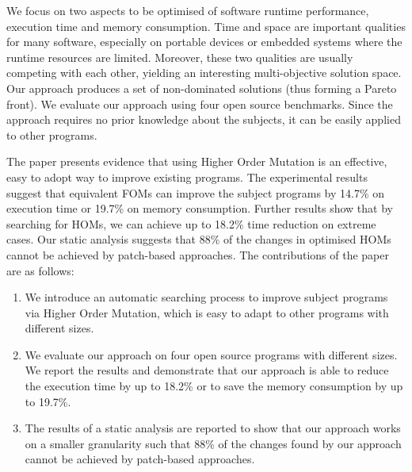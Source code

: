 \documentclass[oribibl]{llncs}
\begin{document}
We focus on two aspects to be optimised of software runtime performance, execution time and memory consumption.
Time and space are important qualities for many software, especially on portable devices or embedded systems where the runtime resources are limited.
Moreover, these two qualities are usually competing with each other, yielding an interesting multi-objective solution space.
Our approach produces a set of non-dominated solutions (thus forming a Pareto front).
We evaluate our approach using four open source benchmarks. 
Since the approach requires no prior knowledge about the subjects, it can be easily applied to other programs.

The paper presents evidence that using Higher Order Mutation is an effective, easy to adopt way to improve existing programs. 
The experimental results suggest that equivalent FOMs can improve the subject programs by 14.7\% on execution time or 19.7\% on memory consumption.
Further results show that by searching for HOMs, we can achieve up to 18.2\% time reduction on extreme cases.
Our static analysis suggests that 88\% of the changes in optimised HOMs cannot be achieved by patch-based approaches.
The contributions of the paper are as follows:
\begin{enumerate}
\item We introduce an automatic searching process to improve subject programs via Higher Order Mutation, which is easy to adapt to other programs with different sizes.
\item We evaluate our approach on four open source programs with different sizes. We report the results and demonstrate that our approach is able to reduce the execution time by up to 18.2\% or to save the memory consumption by up to 19.7\%.
\item The results of a static analysis are reported to show that our approach works on a smaller granularity such that 88\% of the changes found by our approach cannot be achieved by patch-based approaches.
\end{enumerate}

\end{document}
